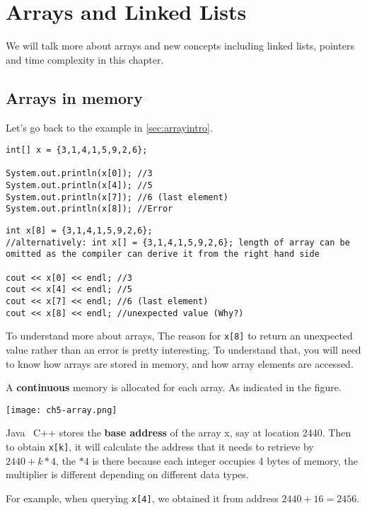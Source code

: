\chapter{Arrays and Linked Lists}

\label{sec:arraychap}
We will talk more about arrays and new concepts including linked lists, pointers and time complexity in this chapter.

\section{Arrays in memory}

Let's go back to the example in \cref{sec:arrayintro}.

\if{}
\begin{lstlisting}
int[] x = {3,1,4,1,5,9,2,6};

System.out.println(x[0]); //3 
System.out.println(x[4]); //5
System.out.println(x[7]); //6 (last element)
System.out.println(x[8]); //Error 
\end{lstlisting}
\else
\begin{lstlisting}
int x[8] = {3,1,4,1,5,9,2,6};
//alternatively: int x[] = {3,1,4,1,5,9,2,6}; length of array can be omitted as the compiler can derive it from the right hand side

cout << x[0] << endl; //3 
cout << x[4] << endl; //5
cout << x[7] << endl; //6 (last element)
cout << x[8] << endl; //unexpected value (Why?)
\end{lstlisting}
\fi

\if{} To understand more about arrays, \else The reason for \texttt{x[8]} to return an unexpected value rather than an error is pretty interesting. To understand that, \fi you will need to know how arrays are stored in memory, and how array elements are accessed. 

A \textbf{continuous} memory is allocated for each array. As indicated in the figure.

\texttt{[image: ch5-array.png]}

\if{} Java \else ~C++ \fi stores the \textbf{base address} of the array x, say at location 2440. Then to obtain \texttt{x[k]}, it will calculate the address that it needs to retrieve by $2440 + k*4$, the $*4$ is there because each integer occupies 4 bytes of memory, the multiplier is different depending on different data types. 

For example, when querying \texttt{x[4]}, we obtained it from address $2440+16 = 2456$. 

